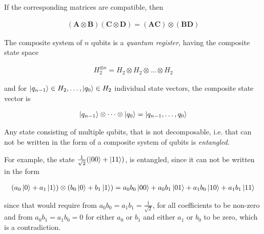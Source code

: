 \begin{property}
\label{TensorDistributivity}

If the corresponding matrices are compatible, then

\begin{align*}
  (\mathbf{A} \otimes \mathbf{B})(\mathbf{C} \otimes \mathbf{D}) = (\mathbf{A}\mathbf{C}) \otimes (\mathbf{B}\mathbf{D})
\end{align*}
\end{property}

\begin{definition}

The composite system of $n$ qubits is a \textit{quantum register}, having the composite state space

\begin{align*}
H_2^{\otimes{}n} = H_2 \otimes H_2 \otimes ... \otimes H_2
\end{align*}

and for $\ket{q_{n-1}} \in H_2, \dots, \ket{q_{0}} \in H_2$ individual state vectors, the composite state vector is

\begin{align*}
\ket{q_{n-1}} \otimes \dots \otimes \ket{q_{0}} = \ket{q_{n-1},\dots,q_0}
\end{align*}

\end{definition}

\begin{definition}
Any state consisting of multiple qubits, that is not decomposable, i.e. that can not be written in the form of a composite system of qubits is \textit{entangled}.
\end{definition}

For example, the state $\frac{1}{\sqrt{2}}(\ket{00} + \ket{11})$, is entangled, since it can not be written in the form

\begin{align*}
(a_0\ket{0} + a_1\ket{1})\otimes(b_0\ket{0}+b_1\ket{1}) = a_0b_0\ket{00}+a_0b_1\ket{01}+a_1b_0\ket{10}+a_1b_1\ket{11}
\end{align*}

since that would require from $a_0b_0 = a_1b_1 = \frac{1}{\sqrt{2}}$, for all coefficients to be non-zero
and from $a_0b_1 = a_1b_0 = 0$ for either $a_0$ or $b_1$ and either $a_1$ or $b_0$ to be zero, which is a contradiction.
